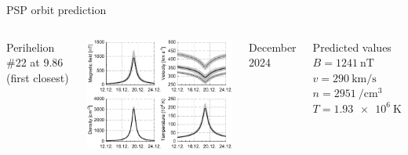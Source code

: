 \begin{frame}[c]{PSP orbit prediction}{}
	\begin{columns}[c]
		
		\centering
		Perihelion \#22 at 9.86~\Rs{} (first closest)\\\ 
		
		\includegraphics[width=\textwidth]{../figures_paper/SPP_perihelia_prediction_nearest_f_plot.pdf}
		
		December 2024
		
		
		\begin{block}{Predicted values}
			$B = \SI{1241}{\nano\tesla}$\\
			$v = \SI{290}{\km\per\s}$\\
			$n = \SI{2951}{\per\cm\cubed}$\\
			$T = \SI{1.93e6}{\kelvin}$
		\end{block}
		
	\end{columns}
\end{frame}
